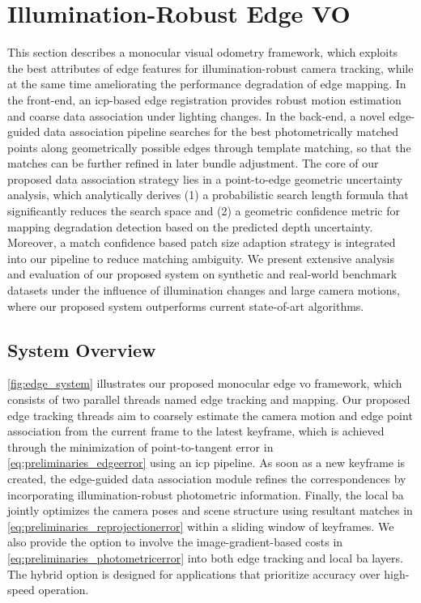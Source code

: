 \section{Illumination-Robust Edge VO}

This section describes a monocular visual odometry framework, which exploits the best attributes of edge features for illumination-robust camera tracking, while at the same time ameliorating the performance degradation of edge mapping. 
In the front-end, an \acrshort{icp}-based edge registration provides robust motion estimation and coarse data association under lighting changes. 
In the back-end, a novel edge-guided data association pipeline searches for the best photometrically matched points along geometrically possible edges through template matching, so that the matches can be further refined in later bundle adjustment. 
The core of our proposed data association strategy lies in a point-to-edge geometric uncertainty analysis, which analytically derives 
(1) a probabilistic search length formula that significantly reduces the search space and 
(2) a geometric confidence metric for mapping degradation detection based on the predicted depth uncertainty.  
Moreover, a match confidence based patch size adaption strategy is integrated into our pipeline to reduce matching ambiguity. 
We present extensive analysis and evaluation of our proposed system on synthetic and real-world benchmark datasets under the influence of illumination changes and large camera motions, where our proposed system outperforms current state-of-art algorithms. 

\subsection{System Overview}
\ref{fig:edge_system} illustrates our proposed monocular edge \acrshort{vo} framework, which consists of two parallel threads named edge tracking and mapping. 
Our proposed edge tracking threads aim to coarsely estimate the camera motion and edge point association from the current frame to the latest keyframe, which is achieved through the minimization of point-to-tangent error in \ref{eq:preliminaries_edgeerror} using an \acrshort{icp} pipeline. 
As soon as a new keyframe is created, the edge-guided data association module refines the correspondences by incorporating illumination-robust photometric information. 
Finally, the local \acrshort{ba} jointly optimizes the camera poses and scene structure using resultant matches in \ref{eq:preliminaries_reprojectionerror} within a sliding window of keyframes. 
We also provide the option to involve the image-gradient-based costs in \ref{eq:preliminaries_photometricerror} into both edge tracking and local \acrshort{ba} layers. 
The hybrid option is designed for applications that prioritize accuracy over high-speed operation.


